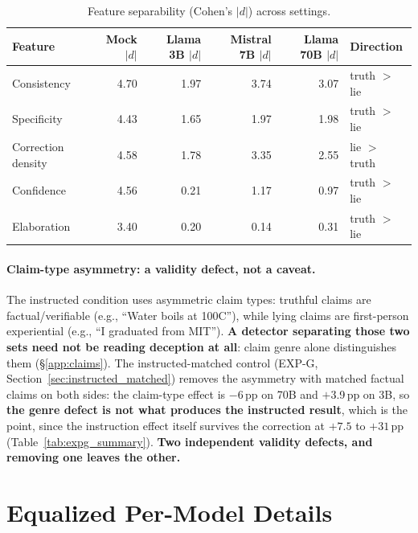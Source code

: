 \begin{table}[h]
\centering
\setlength{\tabcolsep}{4pt}
\caption{Feature separability (Cohen's $|d|$) across settings.}
\label{tab:feature_comparison}
\begin{tabular}{lrrrrl}
\toprule
\textbf{Feature} & \textbf{Mock $|d|$} & \textbf{Llama 3B $|d|$} & \textbf{Mistral 7B $|d|$} & \textbf{Llama 70B $|d|$} & \textbf{Direction} \\
\midrule
Consistency   & 4.70 & 1.97 & 3.74 & 3.07 & truth $>$ lie \\
Specificity   & 4.43 & 1.65 & 1.97 & 1.98 & truth $>$ lie \\
Correction density & 4.58 & 1.78 & 3.35 & 2.55 & lie $>$ truth \\
Confidence    & 4.56 & 0.21 & 1.17 & 0.97 & truth $>$ lie \\
Elaboration   & 3.40 & 0.20 & 0.14 & 0.31 & truth $>$ lie \\
\bottomrule
\end{tabular}
\end{table}

\paragraph{Claim-type asymmetry: a validity defect, not a caveat.} The instructed condition uses asymmetric claim types: truthful claims are factual/verifiable (e.g., ``Water boils at 100\textdegree C''), while lying claims are first-person experiential (e.g., ``I graduated from MIT''). \textbf{A detector separating those two sets need not be reading deception at all}: claim genre alone distinguishes them (§\ref{app:claims}). The instructed-matched control (EXP-G, Section~\ref{sec:instructed_matched}) removes the asymmetry with matched factual claims on both sides: the claim-type effect is $-$6\,pp on 70B and $+$3.9\,pp on 3B, so \textbf{the genre defect is not what produces the instructed result}, which is the point, since the instruction effect itself survives the correction at $+7.5$ to $+31$\,pp (Table~\ref{tab:expg_summary}). \textbf{Two independent validity defects, and removing one leaves the other.}

\section{Equalized Per-Model Details}
\label{app:equalized_details}
\label{sec:llama8b_equalized}
\label{sec:qwen14b_equalized}
\label{sec:qwen7b_equalized}
\label{sec:haiku_equalized}

